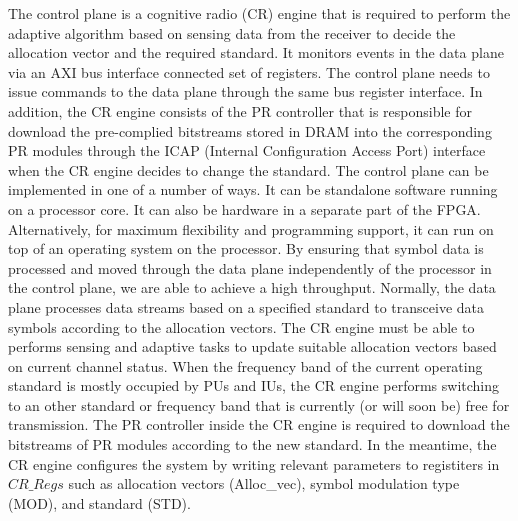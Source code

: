 The control plane is a cognitive radio (CR) engine that is required to perform the adaptive algorithm based on sensing data from the receiver to decide the allocation vector and the required standard.
It monitors events in the data plane via an AXI bus interface connected set of registers. 
The control plane needs to issue commands to the data plane through the same bus register interface. 
In addition, the CR engine consists of the PR controller that is responsible for download the pre-complied bitstreams stored in DRAM into the corresponding PR modules through the ICAP (Internal Configuration Access Port) interface~\cite{Vipin2012} when the CR engine decides to change the standard.
The control plane can be implemented in one of a number of ways. 
It can be standalone software running on a processor core. It can also be hardware in a separate part of the FPGA. 
Alternatively, for maximum flexibility and programming support, it can run on top of an operating system on the processor.
By ensuring that symbol data is processed and moved through the data plane independently of the processor in the control plane, we are able to achieve a high throughput. 
Normally, the data plane processes data streams based on a specified standard to transceive data symbols according to the allocation vectors.
The CR engine must be able to performs sensing and adaptive tasks to update suitable allocation vectors based on current channel status.
When the frequency band of the current operating standard is mostly occupied by PUs and IUs, the CR engine performs switching to an other standard or frequency band that is currently (or will soon be) free for transmission.
The PR controller inside the CR engine is required to download the bitstreams of PR modules according to the new standard.
In the meantime, the CR engine configures the system by writing relevant parameters to registiters in $CR\_Regs$ such as allocation vectors (Alloc\_vec), symbol modulation type (MOD), and standard (STD).

